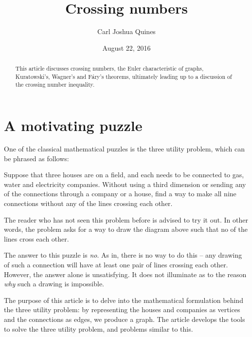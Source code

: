 \documentclass[11pt,paper=letter]{scrartcl}
\begin{document}
\title{Crossing numbers}
\author{Carl Joshua Quines}
\date{August 22, 2016}

\maketitle

\begin{abstract}
This article discusses crossing numbers, the Euler characteristic of graphs, Kuratowski's, Wagner's and F\'{a}ry's theorems, ultimately leading up to a discussion of the crossing number inequality.
\end{abstract}

\section{A motivating puzzle}

One of the classical mathematical puzzles is the three utility problem, which can be phrased as follows:

\begin{problem}
Suppose that three houses are on a field, and each needs to be connected to gas, water and electricity companies. Without using a third dimension or sending any of the connections through a company or a house, find a way to make all nine connections without any of the lines crossing each other.
\end{problem}

\begin{center}
\end{center}

The reader who has not seen this problem before is advised to try it out. In other words, the problem asks for a way to draw the diagram above such that no of the lines cross each other.

The answer to this puzzle is \emph{no}. As in, there is no way to do this -- any drawing of such a connection will have at least one pair of lines crossing each other. However, the answer alone is unsatisfying. It does not illuminate as to the reason \emph{why} such a drawing is impossible.

The purpose of this article is to delve into the mathematical formulation behind the three utility problem: by representing the houses and companies as vertices and the connections as edges, we produce a graph. The article develops the tools to solve the three utility problem, and problems similar to this.
\end{document}
